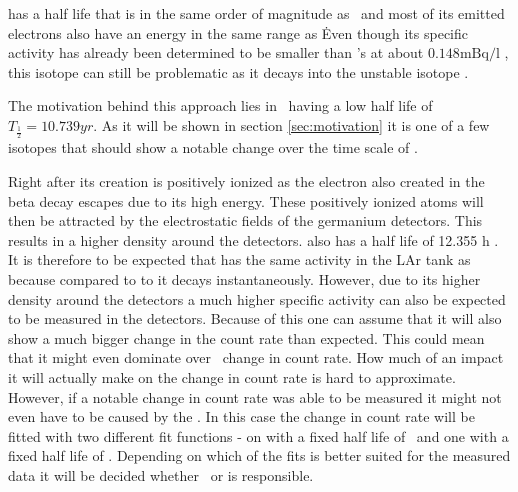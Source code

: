 \documentclass[encoding=utf8,british]{tumphthesis}
\begin{document}
 has a half life that is in the same order of magnitude as \Kr\ and most of its emitted electrons also have an energy in the same range as \Kr\.
Even though its specific activity has already been determined to be smaller than \Kr's at about $0.148\mathrm{mBq/l}$ \cite{becerici_schmidt_results_2014}, this isotope can still be problematic as it decays into the unstable isotope .





The motivation behind this approach lies in \Kr\ having a low half life of $T_{\frac{1}{2}} = 10.739\unit{yr}$.
As it will be shown in section \ref{sec:motivation} it is one of a few isotopes that should show a notable change over the time scale of \PII.









Right after its creation  is positively ionized as the electron also created in the beta decay escapes due to its high energy.
These positively ionized  atoms will then be attracted by the electrostatic fields of the germanium detectors.
This results in a higher  density around the detectors.
 also has a half life of 12.355 h \cite{chen_nuclear_2016}.
It is therefore to be expected that  has the same activity in the LAr tank as  because compared to to  it decays instantaneously.
However, due to its higher density around the detectors a much higher specific activity can also be expected to be measured in the detectors.
Because of this one can assume that it will also show a much bigger change in the count rate than expected.
This could mean that it might even dominate over \Kr\ change in count rate.
How much of an impact it will actually make on the change in count rate is hard to approximate.
However, if a notable change in count rate was able to be measured it might not even have to be caused by the \Kr.
In this case the change in count rate will be fitted with two different fit functions - on with a fixed half life of \Kr\ and one with a fixed half life of .
Depending on which of the fits is better suited for the measured data it will be decided whether \Kr\ or  is responsible. 

\\
\end{document}
